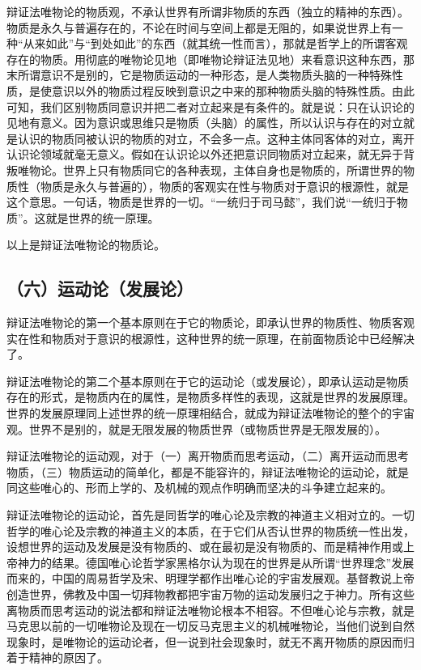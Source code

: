 辩证法唯物论的物质观，不承认世界有所谓非物质的东西（独立的精神的东西）。物质是永久与普遍存在的，不论在时间与空间上都是无阻的，如果说世界上有一种“从来如此”与“到处如此”的东西（就其统一性而言），那就是哲学上的所谓客观存在的物质。用彻底的唯物论见地（即唯物论辩证法见地）来看意识这种东西，那末所谓意识不是别的，它是物质运动的一种形态，是人类物质头脑的一种特殊性质，是使意识以外的物质过程反映到意识之中来的那种物质头脑的特殊性质。由此可知，我们区别物质同意识并把二者对立起来是有条件的。就是说：只在认识论的见地有意义。因为意识或思维只是物质（头脑）的属性，所以认识与存在的对立就是认识的物质同被认识的物质的对立，不会多一点。这种主体同客体的对立，离开认识论领域就毫无意义。假如在认识论以外还把意识同物质对立起来，就无异于背叛唯物论。世界上只有物质同它的各种表现，主体自身也是物质的，所谓世界的物质性（物质是永久与普遍的），物质的客观实在性与物质对于意识的根源性，就是这个意思。一句话，物质是世界的一切。“一统归于司马懿”，我们说“一统归于物质”。这就是世界的统一原理。

以上是辩证法唯物论的物质论。

\subsection{（六）运动论（发展论）}

辩证法唯物论的第一个基本原则在于它的物质论，即承认世界的物质性、物质客观实在性和物质对于意识的根源性，这种世界的统一原理，在前面物质论中已经解决了。

辩证法唯物论的第二个基本原则在于它的运动论（或发展论），即承认运动是物质存在的形式，是物质内在的属性，是物质多样性的表现，这就是世界的发展原理。世界的发展原理同上述世界的统一原理相结合，就成为辩证法唯物论的整个的宇宙观。世界不是别的，就是无限发展的物质世界（或物质世界是无限发展的）。

辩证法唯物论的运动观，对于（一）离开物质而思考运动，（二）离开运动而思考物质，（三）物质运动的简单化，都是不能容许的，辩证法唯物论的运动论，就是同这些唯心的、形而上学的、及机械的观点作明确而坚决的斗争建立起来的。

辩证法唯物论的运动论，首先是同哲学的唯心论及宗教的神道主义相对立的。一切哲学的唯心论及宗教的神道主义的本质，在于它们从否认世界的物质统一性出发，设想世界的运动及发展是没有物质的、或在最初是没有物质的、而是精神作用或上帝神力的结果。德国唯心论哲学家黑格尔认为现在的世界是从所谓“世界理念”发展而来的，中国的周易哲学及宋、明理学都作出唯心论的宇宙发展观。基督教说上帝创造世界，佛教及中国一切拜物教都把宇宙万物的运动发展归之于神力。所有这些离物质而思考运动的说法都和辩证法唯物论根本不相容。不但唯心论与宗教，就是马克思以前的一切唯物论及现在一切反马克思主义的机械唯物论，当他们说到自然现象时，是唯物论的运动论者，但一说到社会现象时，就无不离开物质的原因而归着于精神的原因了。

